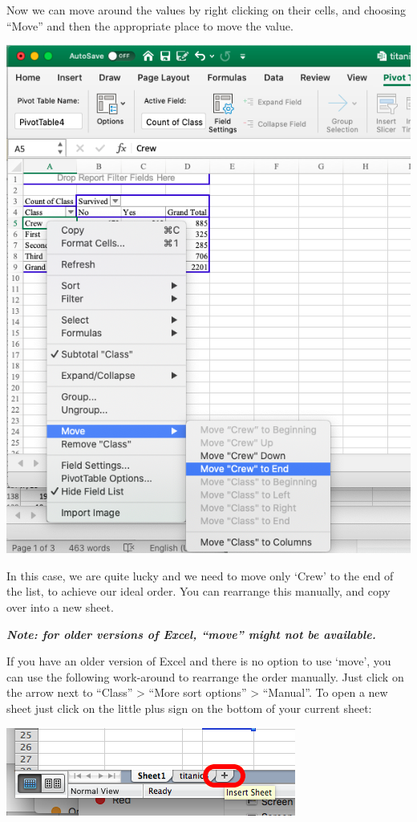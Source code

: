 \documentclass[
]{book}
\begin{document}
Now we can move around the values by right clicking on their cells, and choosing ``Move'' and then the appropriate place to move the value.

\includegraphics{imgs/rearrange_crew.png}

In this case, we are quite lucky and we need to move only `Crew' to the end of the list, to achieve our ideal order.
You can rearrange this manually, and copy over into a new sheet.

\textbf{\emph{Note: for older versions of Excel, ``move'' might not be available.}}

If you have an older version of Excel and there is no option to use `move', you can use the following work-around to rearrange the order manually. Just click on the arrow next to ``Class'' \textgreater{} ``More sort options'' \textgreater{} ``Manual''. To open a new sheet just click on the little plus sign on the bottom of your current sheet:

\includegraphics{imgs/new_sheet_2.png}
\end{document}
